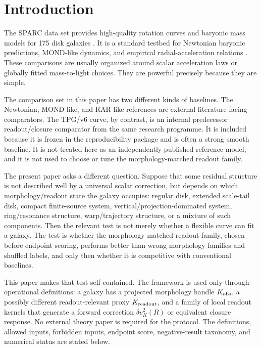 \documentclass[11pt]{article}
\begin{document}
\section{Introduction}

The SPARC data set provides high-quality rotation curves and baryonic mass
models for 175 disk galaxies \cite{Lelli2016SPARC}.  It is a standard testbed
for Newtonian baryonic predictions, MOND-like dynamics, and empirical
radial-acceleration relations \cite{Milgrom1983MOND,McGaugh2016RAR,Li2018RARFits}.
These comparisons are usually organized around scalar acceleration laws or
globally fitted mass-to-light choices.  They are powerful precisely because they
are simple.

The comparison set in this paper has two different kinds of baselines.  The
Newtonian, MOND-like, and RAR-like references are external literature-facing
comparators.  The TPG/v6 curve, by contrast, is an internal predecessor
readout/closure comparator from the same research programme.  It is included
because it is frozen in the reproducibility package and is often a strong
smooth baseline.  It is not treated here as an independently published
reference model, and it is not used to choose or tune the morphology-matched
readout family.

The present paper asks a different question.  Suppose that some residual
structure is not described well by a universal scalar correction, but depends on
which morphology/readout state the galaxy occupies: regular disk, extended
scale-tail disk, compact finite-source system, vertical/projection-dominated
system, ring/resonance structure, warp/trajectory structure, or a mixture of such
components.  Then the relevant test is not merely whether a flexible curve can
fit a galaxy.  The test is whether the morphology-matched readout family,
chosen before endpoint scoring, performs better than wrong morphology families
and shuffled labels, and only then whether it is competitive with conventional
baselines.

This paper makes that test self-contained.  The framework is used only through
operational definitions: a galaxy has a projected morphology handle
\(K_{\rm obs}\), a possibly different readout-relevant proxy
\(K_{\rm readout}\), and a family of local readout kernels that generate a
forward correction \(\delta v_K^2(R)\) or equivalent closure response.  No
external theory paper is required for the protocol.  The definitions, allowed
inputs, forbidden inputs, endpoint score, negative-result taxonomy, and
numerical status are stated below.
\end{document}
